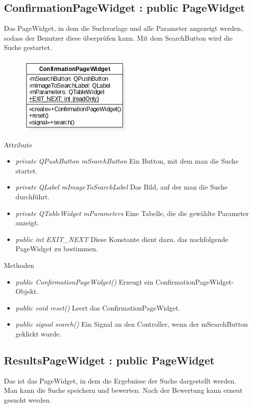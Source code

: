 \subsection*{ConfirmationPageWidget : public PageWidget}
Das PageWidget, in dem die Suchvorlage und alle Parameter angezeigt werden, sodass der Benutzer diese überprüfen kann. Mit dem SearchButton wird die Suche gestartet.

\begin{figure}[H]
	\centering
	\includegraphics[scale=0.5]{img/Klassendiagramm/Klassen/View/ConfirmationPageWidget}
	\label{fig:confirmationPageWidget}
\end{figure}

Attribute
\begin{itemize}
	\item\textit{private QPushButton mSearchButton}
	Ein Button, mit dem man die Suche startet.
	\item\textit{private QLabel mImageToSearchLabel}
	Das Bild, auf der man die Suche durchführt.
	\item\textit{private QTableWidget mParameters}
	Eine Tabelle, die die gewählte Parameter anzeigt.
	\item\textit{public int EXIT\_NEXT} 
	Diese Konstante dient dazu, das nachfolgende PageWidget zu bestimmen. 
\end{itemize}

Methoden
\begin{itemize}
	\item\textit{public ConfirmationPageWidget()}
	Erzeugt ein ConfirmationPageWidget-Objekt.
	\item\textit{public void reset()}
	Leert das ConfirmationPageWidget. 
	\item\textit{public signal search()}
	Ein Signal an den Controller, wenn der mSearchButton geklickt wurde.
\end{itemize}

\subsection*{ResultsPageWidget : public PageWidget}
Das ist das PageWidget, in dem die Ergebnisse der Suche dargestellt werden. Man kann die Suche speichern und bewerten. Nach der Bewertung kann erneut gesucht werden.

